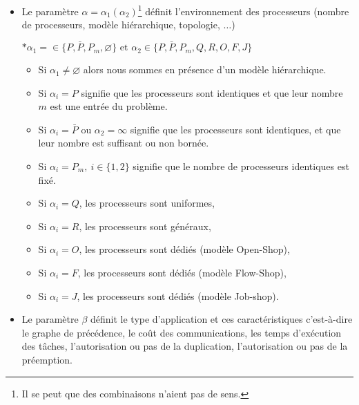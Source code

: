 \documentclass[a4paper,11pt]{article}
\begin{document}
\begin{itemize}

    \item Le paramètre $\alpha=\alpha_1(\alpha_2)$\footnote{Il se peut que des combinaisons n'aient
        pas de sens.} définit l'environnement des processeurs (nombre de processeurs, modèle
        hiérarchique, topologie, $\ldots$)


        $\ast \alpha_1= \in \{ P, \bar{P}, P_m,\varnothing  \} \mbox{ et } \alpha_2 \in \{ P,
        \bar{P}, P_m, Q,R,O,F,J  \}$

        \begin{itemize}

            \item Si $\alpha_1 \neq \varnothing$ alors nous sommes en présence d'un modèle
                hiérarchique.
            \item Si $\alpha_i=P$ signifie que les processeurs sont identiques et que leur nombre
                $m$ est une entrée du problème.

            \item Si $\alpha_i=\bar{P}$ ou $\alpha_2=\infty$ signifie que les processeurs sont
                identiques, et que leur nombre est suffisant ou non bornée.

            \item Si $\alpha_i=P_{m}, ~i \in \{1,2\}$ signifie que le  nombre de processeurs identiques est fixé.
            \item Si $\alpha_i=Q$, les processeurs sont uniformes,
            \item Si $\alpha_i=R$, les processeurs sont généraux,
            \item Si $\alpha_i=O$, les processeurs sont dédiés (modèle Open-Shop),
            \item Si $\alpha_i=F$, les processeurs sont dédiés (modèle Flow-Shop),
            \item Si $\alpha_i=J$, les processeurs sont dédiés (modèle Job-shop).
        \end{itemize}

    \item Le paramètre $\beta$  définit le type d'application et ces caractéristiques c'est-à-dire
        le graphe de précédence, le coût des communications, les temps d'exécution des tâches,
        l'autorisation ou pas de la duplication, l'autorisation ou pas de la préemption.


\end{itemize}
\end{document}
